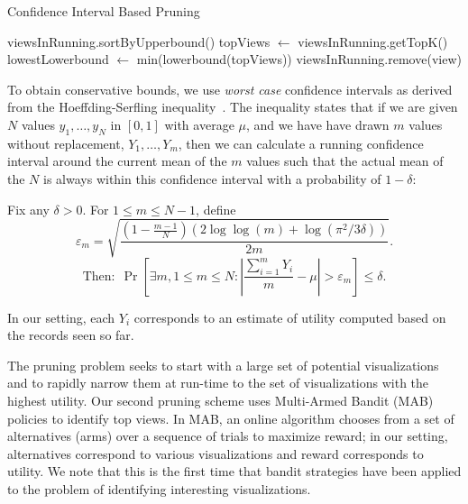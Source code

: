 


\begin{algorithm}
\caption{Confidence Interval Based Pruning}
\label{algo:ci_based_pruning}
\begin{algorithmic}[1]
\State viewsInRunning.sortByUpperbound()
\State topViews $\gets$ viewsInRunning.getTopK()
\State lowestLowerbound $\gets$ min(lowerbound(topViews))
\State viewsInRunning.remove(view)
\EndIf
\EndFor
\end{algorithmic}
\end{algorithm}

To obtain conservative bounds, we use {\it worst case} confidence intervals as derived from
the Hoeffding-Serfling inequality~\cite{serfling1974probability}.
The inequality states that if we are given $N$ values $y_1, \ldots, y_N$ in 
$[0, 1]$ with average $\mu$, and we have have drawn $m$ values without replacement, $Y_1, \ldots, Y_m$, 
then we can calculate a running confidence interval around the current mean 
of the $m$ values such that the actual mean of the $N$
is always within this confidence interval with a probability of $1 - \delta$:
\begin{theorem}
\label{thm:hs}

Fix any $\delta > 0$. For $1 \le m \le N-1$, define
{\small $$
\varepsilon_m = \sqrt{\frac{(1-\frac{m-1}N)(2\log \log (m) + \log(\pi^2/3\delta))}{2m}}.
$$
$$
\textrm{Then:} \ \   \Pr\left[ \exists m, 1 \le m \le N : 
  \left|\frac{\sum_{i=1}^m Y_i}{m} - \mu\right| > \varepsilon_m \right] 
\le \delta.
$$
}

\end{theorem}
In our setting, each $Y_i$ corresponds to an estimate of utility computed based on the
records seen so far. 


\label{sec:multi_armed_bandit}
The \SeeDB pruning problem seeks to start with a large set of potential
visualizations and to rapidly narrow them at run-time to the set of 
visualizations with the highest utility.
Our second pruning scheme uses Multi-Armed Bandit (MAB)~\cite{bandits, AuerCF02, LaiR85} policies to identify top views.
In MAB, an online algorithm chooses from a set of alternatives (arms)
 over a sequence of trials to maximize reward; in our setting, alternatives correspond to various visualizations and reward corresponds
 to utility. 
We note that this is the first time that bandit strategies have been
applied to the problem of identifying interesting visualizations.

